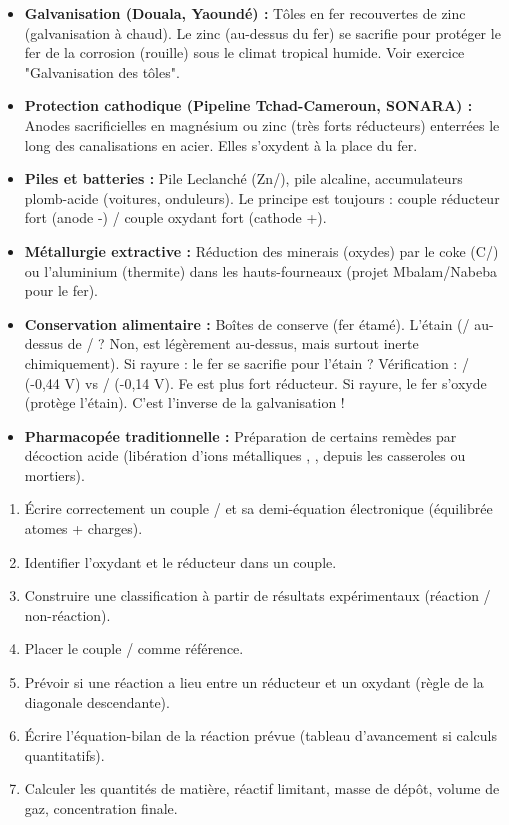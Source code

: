 \documentclass[11pt]{article}
\newcommand{\cle}[1]{{\popxbold\color{popdark}#1}}
\begin{document}
\begin{savaistu}
\begin{itemize}
    \item \textbf{Galvanisation (Douala, Yaoundé) :} Tôles en fer recouvertes de zinc (\cle{galvanisation à chaud}). Le zinc (au-dessus du fer) se sacrifie pour protéger le fer de la corrosion (rouille) sous le climat tropical humide. Voir exercice "Galvanisation des tôles".
    \item \textbf{Protection cathodique (Pipeline Tchad-Cameroun, SONARA) :} Anodes sacrificielles en magnésium ou zinc (très forts réducteurs) enterrées le long des canalisations en acier. Elles s'oxydent à la place du fer.
    \item \textbf{Piles et batteries :} Pile Leclanché (Zn/), pile alcaline, accumulateurs plomb-acide (voitures, onduleurs). Le principe est toujours : couple réducteur fort (anode -) / couple oxydant fort (cathode +).
    \item \textbf{Métallurgie extractive :} Réduction des minerais (oxydes) par le coke (C/) ou l'aluminium (thermite) dans les hauts-fourneaux (projet Mbalam/Nabeba pour le fer).
    \item \textbf{Conservation alimentaire :} Boîtes de conserve (fer étamé). L'étain (/ au-dessus de / ? Non,  est légèrement au-dessus, mais surtout inerte chimiquement). Si rayure : le fer se sacrifie pour l'étain ? Vérification : / (-0,44 V) vs / (-0,14 V). Fe est plus fort réducteur. Si rayure, le fer s'oxyde (protège l'étain). C'est l'inverse de la galvanisation !
    \item \textbf{Pharmacopée traditionnelle :} Préparation de certains remèdes par décoction acide (libération d'ions métalliques , ,  depuis les casseroles ou mortiers).
\end{itemize}
\end{savaistu}

\begin{aretenir}
\begin{enumerate}
    \item Écrire correctement un couple / et sa demi-équation électronique (équilibrée atomes + charges).
    \item Identifier l'oxydant et le réducteur dans un couple.
    \item Construire une classification à partir de résultats expérimentaux (réaction / non-réaction).
    \item Placer le couple / comme référence.
    \item Prévoir si une réaction a lieu entre un réducteur et un oxydant (règle de la diagonale descendante).
    \item Écrire l'équation-bilan de la réaction prévue (tableau d'avancement si calculs quantitatifs).
    \item Calculer les quantités de matière, réactif limitant, masse de dépôt, volume de gaz, concentration finale.
\end{enumerate}
\end{aretenir}
\end{document}
